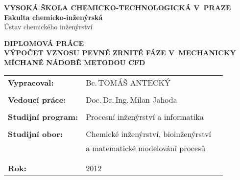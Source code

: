 \vspace{20mm}
\begin{center}
{\large \textbf{VYSOKÁ ŠKOLA CHEMICKO-TECHNOLOGICKÁ V~PRAZE}\\}
{\large \textbf{Fakulta chemicko-inženýrská}\\
Ústav chemického inženýrství\\}
\vspace{15mm}


\vspace{40mm}

{\huge \textbf{DIPLOMOVÁ PRÁCE\\}}
\vspace{25mm}
{\large \textbf{VÝPOČET VZNOSU PEVNÉ ZRNITÉ FÁZE V~MECHANICKY MÍCHANÉ NÁDOBĚ METODOU CFD\\}}
\end{center}
\vspace{35mm}

\begin{tabular}{p{60mm}lp{50mm}}
\textbf{Vypracoval:} & Bc.\,TOMÁŠ ANTECKÝ\\
\\
\textbf{Vedoucí práce:} & Doc.\,Dr.\,Ing.\,Milan Jahoda \\

\\
\textbf{Studijní program:} & Procesní inženýrství a informatika \\
\\
\textbf{Studijní obor:} & Chemické inženýrství, bioinženýrství  \\
	& a matematické modelování procesů\\
\\
\\
\textbf{Rok:} & 2012 \\
\end{tabular}
